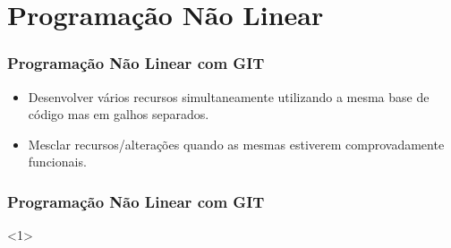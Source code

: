 \section{Programação Não Linear}

\begin{frame}
\frametitle{Programação Não Linear com GIT}

\begin{itemize}
\item Desenvolver vários recursos simultaneamente utilizando a mesma base de código mas em galhos separados.
\item Mesclar recursos/alterações quando as mesmas estiverem comprovadamente funcionais.
\end{itemize}
\end{frame}

\begin{frame}
\frametitle{Programação Não Linear com GIT}
<1>
\end{frame}

